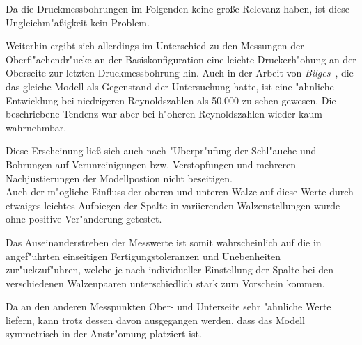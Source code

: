 Da die Druckmessbohrungen im Folgenden keine gro\ss{}e Relevanz haben, ist diese Ungleichm"a\ss{}igkeit kein Problem.

Weiterhin ergibt sich allerdings im Unterschied zu den Messungen der Oberfl"achendr"ucke an der Basiskonfiguration eine leichte Druckerh"ohung an der Oberseite zur letzten Druckmessbohrung hin.
Auch in der Arbeit von \emph{Bilges} \,\cite{Bilges.2018}, die das gleiche Modell als Gegenstand der Untersuchung hatte, ist eine "ahnliche Entwicklung bei niedrigeren Reynoldszahlen als 50.000 zu sehen gewesen.
Die beschriebene Tendenz war aber bei h"oheren Reynoldszahlen wieder kaum wahrnehmbar.


Diese Erscheinung lie\ss{} sich auch nach "Uberpr"ufung der Schl"auche und Bohrungen auf Verunreinigungen bzw. Verstopfungen und mehreren Nachjustierungen der Modellpostion nicht beseitigen.\\
Auch der m"ogliche Einfluss der oberen und unteren Walze auf diese Werte durch etwaiges leichtes Aufbiegen der Spalte in variierenden Walzenstellungen wurde ohne positive Ver"anderung getestet.

Das Auseinanderstreben der Messwerte ist somit wahrscheinlich auf die in \cite{Bilges.2018} angef"uhrten einseitigen Fertigungstoleranzen und Unebenheiten zur"uckzuf"uhren, welche je nach individueller Einstellung der Spalte bei den verschiedenen Walzenpaaren unterschiedlich stark zum Vorschein kommen.

Da an den anderen Messpunkten Ober- und Unterseite sehr "ahnliche Werte liefern, kann trotz dessen davon ausgegangen werden, dass das Modell symmetrisch in der Anstr"omung platziert ist.



%
%
%
